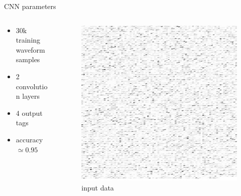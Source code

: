 \documentclass[11pt,compress,xcolor=x11names,UTF8]{beamer}
\begin{document}
\begin{frame}{ CNN parameters}

\begin{columns}
\begin{column}{.47\textwidth}
\begin{itemize}
	\item 30k training waveform samples
	\item 2 convolution layers
	\item 4 output tags
	\item accuracy$\simeq 0.95$
	\end{itemize}
\end{column}
\begin{column}{.5\textwidth}
\begin{figure}
\centering
\includegraphics[width=\textwidth]{figure/PMT_sprite.jpg} %
\caption{input data}
\end{figure}
\end{column}
\end{columns}
\end{frame}
\end{document}
